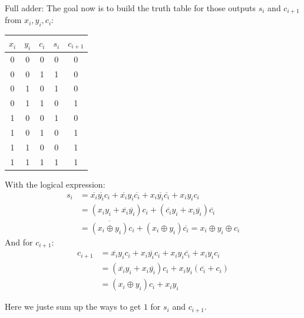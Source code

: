 \begin{parag}{Full adder:}
    The goal now is to build the truth table for those outputs $s_i$ and $c_{i+1}$ from $x_i, y_i, c_i$:
    \begin{center}
    \begin{tabular}{ccc|cc}
        $x_i$ & $y_i$ & $c_i$ & $s_i$ & $c_{i+1}$ \\
        \hline
        0 & 0 & 0&0&0 \\
        0&0&1&1&0\\
        0&1&0&1&0\\
        0&1&1&0&1\\
        1&0&0&1&0\\
        1&0&1&0&1\\
        1&1&0&0&1\\
        1&1&1&1&1
    \end{tabular}
    \end{center}
    
    With the logical expression:
    \begin{align*}
        s_i &= \overline{x_i} \overline{y_i}c_i + \overline{x_i}y_i \overline{c_i} + x_i \overline{y_i} \overline{c_i} + x_iy_ic_i \\
            &= (x_iy_i + \overline{x_i} \overline{y_i})c_i + ( \overline{c_i}y_i + x_i \overline{y_i}) \overline{c_i} \\
            &= \overline{(x_i \oplus y_i)} c_i + (x_i \oplus y_i) \overline{c_i} = x_i \oplus y_i \oplus c_i
    \end{align*}
    And for $c_{i+1}$:
    \begin{align*}
        c_{i+1} &= \overline{x_i}y_ic_i + x_i \overline{y_i}c_i + x_iy_i \overline{c_i} + x_iy_ic_i \\
                &= ( \overline{x_i}y_i + x_i \overline{y_i})c_i + x_iy_i( \overline{c_i} + c_i) \\
                &= (x_i \oplus y_i)c_i + x_iy_i
    \end{align*}
    \begin{framedremark}
        Here we juste sum up the ways to get  $1$ for $s_i$ and $c_{i+1}$.
    \end{framedremark}
    

\end{parag}
